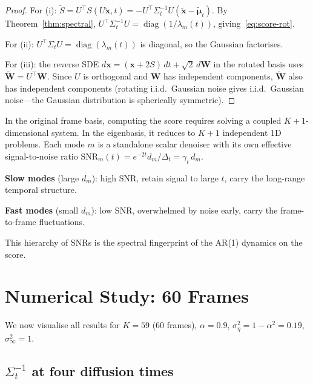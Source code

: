 \documentclass[11pt,a4paper]{article}
\theoremstyle{definition}
\newcommand{\diag}{\operatorname{diag}}
\newcommand{\Dt}{\Delta_t}
\newcommand{\se}{\sigma_\eta^2}
\newcommand{\sinf}{\sigma_\infty^2}
\begin{document}
\begin{proof}
For (i): $\tilde{S} = U^\top S(U\tilde{\mathbf{x}},t) = -U^\top\Sigma_t^{-1}U(\tilde{\mathbf{x}}-\tilde{\bm{\mu}}_t)$.
By Theorem~\ref{thm:spectral}, $U^\top\Sigma_t^{-1}U = \diag(1/\lambda_m(t))$, giving~\eqref{eq:score-rot}.

For (ii): $U^\top\Sigma_t U = \diag(\lambda_m(t))$ is diagonal, so the Gaussian factorises.

For (iii): the reverse SDE $d\mathbf{x} = (\mathbf{x} + 2S)\,dt + \sqrt{2}\,d\mathbf{W}$ in the rotated basis uses $\tilde{\mathbf{W}} = U^\top\mathbf{W}$.
Since $U$ is orthogonal and $\mathbf{W}$ has independent components, $\tilde{\mathbf{W}}$ also has independent components (rotating i.i.d.\ Gaussian noise gives i.i.d.\ Gaussian noise---the Gaussian distribution is spherically symmetric).
\end{proof}

\begin{intbox}
In the original frame basis, computing the score requires solving a coupled $K\!+\!1$-dimensional system.
In the eigenbasis, it reduces to $K\!+\!1$ independent 1D problems.
Each mode $m$ is a standalone scalar denoiser with its own effective signal-to-noise ratio $\text{SNR}_m(t) = e^{-2t}d_m/\Dt = \gamma_t\,d_m$.

\textbf{Slow modes} (large $d_m$): high SNR, retain signal to large $t$, carry the long-range temporal structure.

\textbf{Fast modes} (small $d_m$): low SNR, overwhelmed by noise early, carry the frame-to-frame fluctuations.

This hierarchy of SNRs is the spectral fingerprint of the AR(1) dynamics on the score.
\end{intbox}


\section{Numerical Study: 60 Frames}
\label{sec:numerical}

We now visualise all results for $K = 59$ (60 frames), $\alpha = 0.9$, $\se = 1-\alpha^2 = 0.19$, $\sinf = 1$.

\subsection{$\Sigma_t^{-1}$ at four diffusion times}
\end{document}
